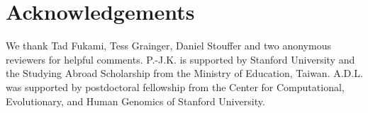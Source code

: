 \section{Acknowledgements}
We thank Tad Fukami, Tess Grainger, Daniel Stouffer and two anonymous reviewers for helpful comments. P.-J.K. is supported by Stanford University and the Studying Abroad Scholarship from the Ministry of Education, Taiwan. A.D.L. was supported by postdoctoral fellowship from the Center for Computational, Evolutionary, and Human Genomics of Stanford University.









\newpage
